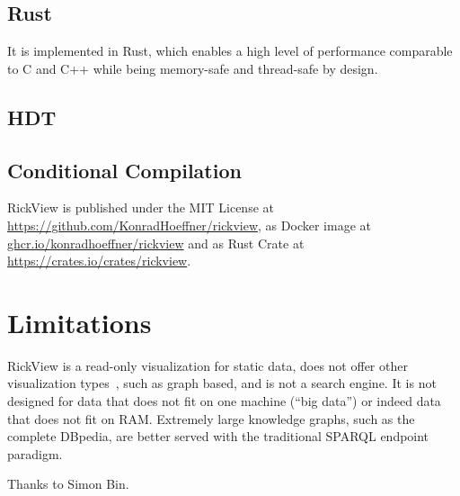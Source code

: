 \documentclass{ceurart}
\begin{document}
\subsection{Rust}
It is implemented in Rust, which enables a high level of performance comparable to C and C++ while being memory-safe and thread-safe by design.

\subsection{HDT}\label{sec:hdt}

\subsection{Conditional Compilation}


RickView is published under the MIT License at \url{https://github.com/KonradHoeffner/rickview}, as Docker image at \url{ghcr.io/konradhoeffner/rickview} and as Rust Crate at \url{https://crates.io/crates/rickview}.

\section{Limitations}
RickView is a read-only visualization for static data, does not offer other visualization types~\citep{linkeddatavisualization}, such as graph based, and is not a search engine.
It is not designed for data that does not fit on one machine (\enquote{big data}) or indeed data that does not fit on RAM.
Extremely large knowledge graphs, such as the complete DBpedia, are better served with the traditional SPARQL endpoint paradigm.


\begin{acknowledgments}
Thanks to Simon Bin.
\end{acknowledgments}
%
%

\end{document}
